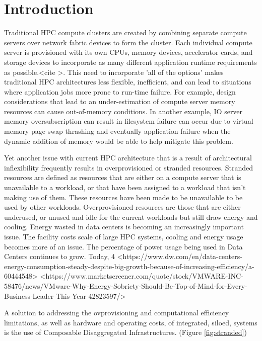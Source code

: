 \section{Introduction}

Traditional HPC compute clusters are created by combining separate compute servers over network fabric devices to form the cluster.  Each individual compute server is provisioned with its own CPUs, memory devices, accelerator cards, and storage devices to incorporate as many different application runtime requirements as possible.<cite >. This need to incorporate 'all of the options' makes traditional HPC architectures less flexible, inefficient, and can lead to situations where application jobs more prone to run-time failure.    
For example, design considerations that lead to an under-estimation of compute server memory resources can cause out-of-memory conditions.  In another example, IO server memory oversubscription can result in filesystem failure can occur due to virtual memory page swap thrashing and eventually application failure when the dynamic addition of memory would be able to help mitigate this problem.  

Yet another issue with current HPC architecture that is a result of architectural inflexibility frequently results in overprovisioned or stranded resources.  Stranded resources are defined as resources that are either on a compute server that is unavailable to a workload, or that have been assigned to a workload that isn't making use of them.  These resources have been made to be unavailable to be used by other workloads. Overprovisioned resources are those that are either underused, or unused and idle for the current workloads but still draw energy and cooling.  Energy wasted in data centers is becoming an increasingly important issue.\cite{eere}
The facility costs scale of large HPC systems, cooling and energy usage becomes more of an issue.  The percentage of power usage being used in Data Centers continues to grow.  Today, 4%
  <https://www.dw.com/en/data-centers-energy-consumption-steady-despite-big-growth-because-of-increasing-efficiency/a-60444548>
  <https://www.marketscreener.com/quote/stock/VMWARE-INC-58476/news/VMware-Why-Energy-Sobriety-Should-Be-Top-of-Mind-for-Every-Business-Leader-This-Year-42823597/>

A solution to addressing the ovprovisioning and computational efficiency limitations, as well as hardware and operating costs, of integrated, siloed, systems is the use of Composable Disaggregated Infrastructures. (Figure \ref{fig:stranded}) 

